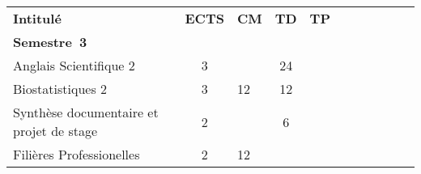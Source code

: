


\renewcommand{\arraystretch}{1.5}%
\begin{tabular}{|m{5cm}|cm{0.75cm}|cm{0.75cm}|cm{0.75cm}|cm{0.75cm}|cm{0.75cm}|}
\cline{1-5}

\cellcolor{couleurFonce} \color{white}\bfseries Intitul\'e & \cellcolor{couleurFonce} \color{white}\bfseries ECTS & \cellcolor{couleurFonce} \color{white}\bfseries CM & \cellcolor{couleurFonce} \color{white}\bfseries TD & \cellcolor{couleurFonce} \color{white}\bfseries TP \\ \cline{1-5}
\cline{1-5} 
\multicolumn{5}{l}{\color{black} \mbox{\textbf{Semestre 3}}}  \\ \cline{1-5}

\color{black} Anglais Scientifique 2 & \color{black} 3 & \color{black} & \color{black} 24 & \color{black} \\ \cline{1-5}

 \cellcolor{couleurClaire} \color{couleurTexte} Biostatistiques 2 & \cellcolor{couleurClaire} \color{couleurTexte} 3 & \cellcolor{couleurClaire} \color{couleurTexte} 12 & \cellcolor{couleurClaire} \color{couleurTexte} 12 & \cellcolor{couleurClaire} \color{couleurTexte} \\ \cline{1-5}

 \color{black} Synthèse documentaire et projet de stage & \color{black} 2 & \color{black} & \color{black} 6 & \color{black} \\ \cline{1-5}

 \cellcolor{couleurClaire} \color{couleurTexte} Filières Professionelles  & \cellcolor{couleurClaire} \color{couleurTexte} 2 & \cellcolor{couleurClaire} \color{couleurTexte} 12 & \cellcolor{couleurClaire} \color{couleurTexte} & \cellcolor{couleurClaire} \color{couleurTexte} 
\\ \cline{1-5}


\end{tabular}
